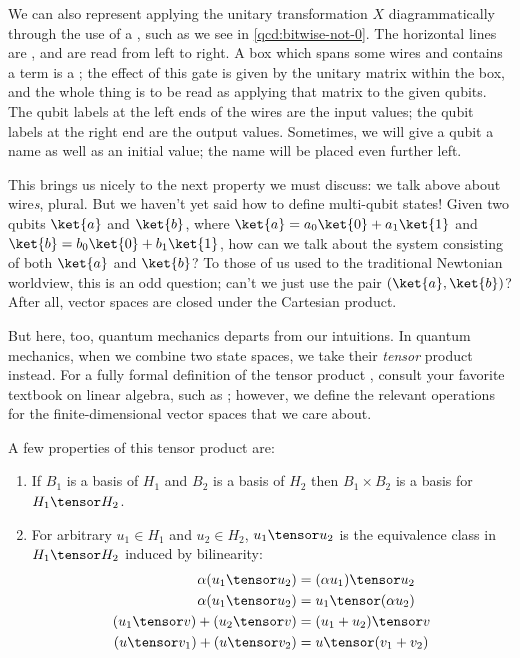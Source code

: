We can also represent applying the unitary transformation $X$ diagrammatically
through the use of a , such as we see in
\cref{qcd:bitwise-not-0}.  The horizontal lines are , and are read
from left to right.  A box which spans some wires and contains a term is a
; the effect of this gate is given by the unitary matrix within the
box, and the whole thing is to be read as applying that matrix to the given
qubits.\footnotemark{}  The qubit labels at the left ends of the wires are the
input values; the qubit labels at the right end are the output values.
Sometimes, we will give a qubit a name as well as an initial value; the name
will be placed even further left.


This brings us nicely to the next property we must discuss: we talk above about
wire\emph{s}, plural.  But we haven't yet said how to define multi-qubit states!
Given two qubits $\ket{a}$ and $\ket{b}$, where $\ket{a} = a_0\ket{0} +
a_1\ket{1}$ and $\ket{b} = b_0\ket{0} + b_1\ket{1}$, how can we talk about the
system consisting of both $\ket{a}$ and $\ket{b}$?  To those of us used to the
traditional Newtonian worldview, this is an odd question; can't we just use the
pair $(\ket{a},\ket{b})$?  After all, vector spaces are closed under the
Cartesian product.

But here, too, quantum mechanics departs from our intuitions.  In quantum
mechanics, when we combine two state spaces, we take their \emph{tensor} product
instead.  For a fully formal definition of the tensor product  , consult your favorite textbook on linear algebra,
such as \cite{gallier13}; however, we define the relevant operations for the
finite-dimensional vector spaces that we care about.

 
A few properties of this tensor
product are:
\begin{enumerate}
    \item If $B_1$ is a basis of $H_1$ and $B_2$ is a basis of $H_2$
    then $B_1 \times B_2$ is a basis for $H_1 \tensor H_2$.
    \item For arbitrary $u_1 \in H_1$ and $u_2 \in H_2$, 
    $u_1 \tensor u_2$ is the equivalence class in $H_1 \tensor H_2$ induced
    by bilinearity:
    \begin{align*}
        \alpha(u_1 \tensor u_2) &= (\alpha u_1) \tensor u_2 \\
        \alpha(u_1 \tensor u_2) &= u_1 \tensor (\alpha u_2) \\
        (u_1 \tensor v) + (u_2 \tensor v) &= (u_1 + u_2) \tensor v \\
        (u \tensor v_1) + (u \tensor v_2) &= u \tensor (v_1 + v_2)
    \end{align*}
\end{enumerate}

